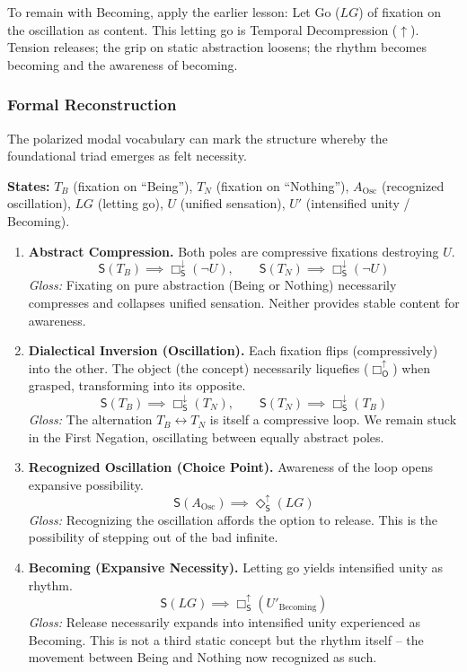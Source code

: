 \documentclass[12pt]{book}
\newcommand{\SBoxUp}{\Box_{\mathsf{S}}^{\uparrow}}
\newcommand{\SBoxDown}{\Box_{\mathsf{S}}^{\downarrow}}
\newcommand{\SDiaUp}{\Diamond_{\mathsf{S}}^{\uparrow}}
\newcommand{\OBoxUp}{\Box_{\mathsf{O}}^{\uparrow}}
\begin{document}
To remain with Becoming, apply the earlier lesson: Let Go ($LG$) of fixation on the oscillation as content. This letting go is Temporal Decompression ($\uparrow$). Tension releases; the grip on static abstraction loosens; the rhythm becomes becoming and the awareness of becoming.

\subsubsection{Formal Reconstruction}

The polarized modal vocabulary can mark the structure whereby the foundational triad emerges as felt necessity.

\textbf{States:} $T_B$ (fixation on ``Being''), $T_N$ (fixation on ``Nothing''), $A_{\mathrm{Osc}}$ (recognized oscillation), $LG$ (letting go), $U$ (unified sensation), $U'$ (intensified unity / Becoming).

\begin{enumerate}
    \item \textbf{Abstract Compression.} Both poles are compressive fixations destroying $U$.
    \[
        \mathsf{S}(T_B) \implies \SBoxDown(\neg U), \qquad \mathsf{S}(T_N) \implies \SBoxDown(\neg U)
    \]
    	\textit{Gloss:} Fixating on pure abstraction (Being or Nothing) necessarily compresses and collapses unified sensation. Neither provides stable content for awareness.

    \item \textbf{Dialectical Inversion (Oscillation).} Each fixation flips (compressively) into the other. The object (the concept) necessarily liquefies ($\OBoxUp$) when grasped, transforming into its opposite.
    \[
        \mathsf{S}(T_B) \implies \SBoxDown(T_N), \qquad \mathsf{S}(T_N) \implies \SBoxDown(T_B)
    \]
    	\textit{Gloss:} The alternation $T_B \leftrightarrow T_N$ is itself a compressive loop. We remain stuck in the First Negation, oscillating between equally abstract poles.

    \item \textbf{Recognized Oscillation (Choice Point).} Awareness of the loop opens expansive possibility.
    \[
        \mathsf{S}(A_{\mathrm{Osc}}) \implies \SDiaUp(LG)
    \]
    	\textit{Gloss:} Recognizing the oscillation affords the option to release. This is the possibility of stepping out of the bad infinite.

    \item \textbf{Becoming (Expansive Necessity).} Letting go yields intensified unity as rhythm.
    \[
        \mathsf{S}(LG) \implies \SBoxUp(U'_{\text{Becoming}})
    \]
    	\textit{Gloss:} Release necessarily expands into intensified unity experienced as Becoming. This is not a third static concept but the rhythm itself -- the movement between Being and Nothing now recognized as such.
\end{enumerate}
\end{document}
